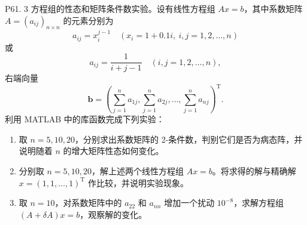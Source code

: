 \documentclass[11pt, a4paper]{ctexart}
\begin{document}
\begin{problem}{P61. 3}
    方程组的性态和矩阵条件数实验。设有线性方程组 $Ax = b$，其中系数矩阵
    $A = (a_{ij})_{n \times n}$ 的元素分别为
    \[
        a_{ij} = x_i^{j-1}
        \quad
        \left(x_i = 1 + 0.1 i,\ i, j = 1, 2, \dots, n \right)
    \]
    或
    \[
        a_{ij} = \frac{1}{i + j - 1}
        \quad
        (i, j = 1, 2, \dots, n),
    \]
    右端向量
    \[
        \boldsymbol{b} =
        \left(
            \sum_{j=1}^n a_{1j},
            \sum_{j=1}^n a_{2j},
            \dots,
            \sum_{j=1}^n a_{nj}
        \right)^{\mathrm{T}}.
    \]
    利用 MATLAB 中的库函数完成下列实验：
    \begin{enumerate}[1.]
        \item 取 $n = 5, 10, 20$，分别求出系数矩阵的 2-条件数，判别它们是否为病态阵，并说明随着 $n$ 的增大矩阵性态如何变化。
        \item 分别取 $n = 5, 10, 20$，解上述两个线性方程组 $Ax = b$。将求得的解与精确解 $x = (1, 1, \dots, 1)^{\mathrm{T}}$ 作比较，并说明实验现象。
        \item 取 $n = 10$，对系数矩阵中的 $a_{22}$ 和 $a_{nn}$ 增加一个扰动 $10^{-8}$，求解方程组 $(A + \delta A)x = b$，观察解的变化。
    \end{enumerate}
\end{problem}
\end{document}
